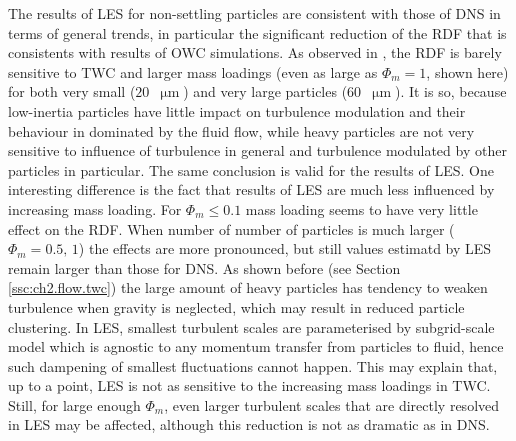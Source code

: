\documentclass{pracamgren}
\begin{document}
The results of LES for non-settling particles are consistent with those of DNS in terms of general trends, in particular the significant reduction of the RDF that is consistents with results of OWC simulations.
As observed in \textcite{Rosa2020}, the RDF is barely sensitive to TWC and larger mass loadings (even as large as $\Phi_m = 1$, shown here) for both very small ($20$~$\upmu\text{m}$) and very large particles ($60$~$\upmu\text{m}$).
It is so, because low-inertia particles have little impact on turbulence modulation and their behaviour in dominated by the fluid flow, while heavy particles are not very sensitive to influence of turbulence in general and turbulence modulated by other particles in particular.
The same conclusion is valid for the results of LES.
One interesting difference is the fact that results of LES are much less influenced by increasing mass loading.
For $\Phi_m \le 0.1$ mass loading seems to have very little effect on the RDF.
When number of number of particles is much larger ($\Phi_m = 0.5, \, 1$) the effects are more pronounced, but still values estimatd by LES remain larger than those for DNS.
As shown before (see Section \ref{ssc:ch2.flow.twc}) the large amount of heavy particles has tendency to weaken turbulence when gravity is neglected, which may result in reduced particle clustering.
In LES, smallest turbulent scales are parameterised by subgrid-scale model which is agnostic to any momentum transfer from particles to fluid, hence such dampening of smallest fluctuations cannot happen.
This may explain that, up to a point, LES is not as sensitive to the increasing mass loadings in TWC.
Still, for large enough $\Phi_m$, even larger turbulent scales that are directly resolved in LES may be affected, although this reduction is not as dramatic as in DNS.
\end{document}
